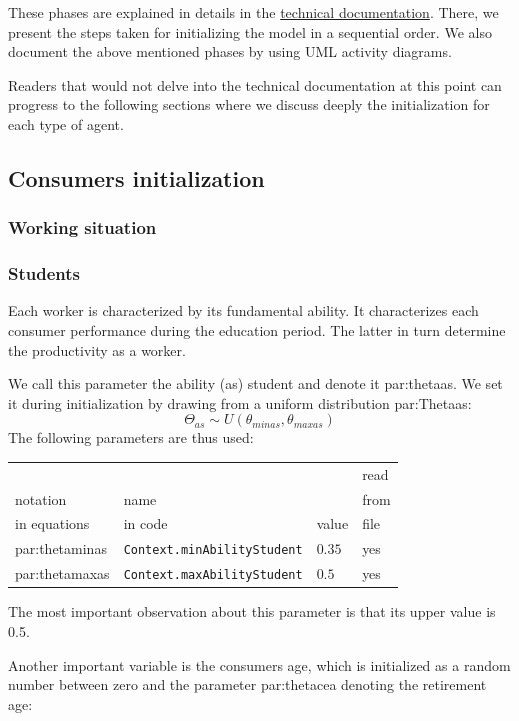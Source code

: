 \documentclass{book}
\newcommand{\doclocation}{file:///Users/giulioni/Documents/workspace/gabriele/docs}
\begin{document}
These phases are explained in details in the \href{\doclocation/index_initialization.html}{technical documentation}. There, we present the steps taken for initializing the model in a sequential order. We also document the above mentioned phases by using UML activity diagrams.

Readers that would not delve into the technical documentation at this point can progress to the following sections where we discuss deeply the initialization for each type of agent.

\subsection{Consumers initialization}

\subsubsection{Working situation}


\subsubsection*{Students}
\label{pref:tudentevolution}

Each worker is characterized by its fundamental ability. It characterizes each consumer performance during the education period. The latter in turn determine the productivity as a worker.

We call this parameter the ability (as) student and denote it \gls{par:thetaas}. We set it during initialization by drawing from a uniform distribution \gls{par:Thetaas}:
\[
	\Theta_{as}\sim U(\theta_{minas},\theta_{maxas})
\]
The following parameters are thus used:\\
\begin{tabular}{l l l l}
	\hline
	& &&read\\
	notation& name &&from\\
	in equations& in code&value&file\\
	\hline
	\hline
	\gls{par:thetaminas}&\verb+Context.minAbilityStudent+&$0.35$&yes\\
 \gls{par:thetamaxas}&\verb+Context.maxAbilityStudent+&$0.5$&yes\\
	\hline
\end{tabular}

\vskip5mm
The most important observation about this parameter is that its upper value is 0.5.

Another important variable is the consumers age, which is initialized as a random number between zero and the parameter \gls{par:thetacea} denoting the retirement age:\\
\end{document}
